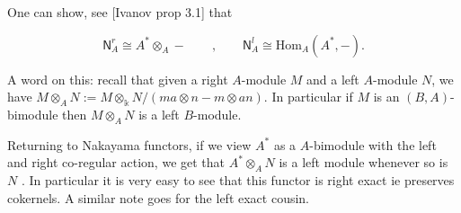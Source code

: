 \documentclass[11pt]{article}
\newcommand{\Hom}{\mathrm{Hom}}
\theoremstyle{definition}
\begin{document}
One can show, see [Ivanov prop 3.1] that 

$$ \mathsf{N}^r_A \cong A^* \otimes_A - \qquad , \qquad \mathsf{N}^l_A \cong \Hom_A(A^*,-).$$

A word on this: recall that given a right $A$-module $M$ and a left $A$-module $N$, we have $M \otimes_A N := M \otimes_\Bbbk N / (ma\otimes n - m \otimes an)$. In particular if $M$ is an $(B,A)$-bimodule then $M \otimes_A N$ is a left $B$-module. 


Returning to Nakayama functors, if we view $A^*$ as a $A$-bimodule with the left and right co-regular action, we get that $A^* \otimes_A N$ is a left module whenever so is $N$ . In particular it is very easy to see that this functor is right exact ie preserves cokernels. A similar note goes for the left exact cousin.
\end{document}
